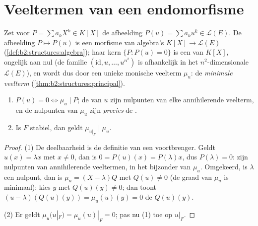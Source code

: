 \section{Veeltermen van een endomorfisme}

\begin{definition}\label{def:b2:reduction:polyu}
Zet voor $P = \sum a_k X^k \in K[X]$ de afbeelding $P(u) = \sum a_k
u^k \in \mathcal{L}(E)$. De afbeelding $P \mapsto P(u)$ is een
morfisme van algebra's $K[X] \to \mathcal{L}(E)$
(\cref{def:b2:structures:algebra}); haar kern $\{P : P(u) = 0\}$ is
een  van $K[X]$, ongelijk aan nul (de familie
$(\mathrm{id}, u, \dots, u^{n^2})$ is afhankelijk in het
$n^2$-dimensionale $\mathcal{L}(E)$), en wordt dus 
door een unieke monische veelterm $\mu_u$: de \emph{minimale
veelterm}
(\cref{thm:b2:structures:principal}).
\end{definition}

\begin{proposition}\label{prop:b2:reduction:minpoly}
\begin{enumerate}
  \item $P(u) = 0 \iff \mu_u \mid P$; de  van $u$ zijn
        nulpunten van elke annihilerende veelterm, en de nulpunten
        van $\mu_u$ zijn \emph{precies} de .
  \item Is $F$ stabiel, dan geldt $\mu_{u|_F} \mid \mu_u$.
\end{enumerate}
\end{proposition}

\begin{proof}
(1) De deelbaarheid is de definitie van een voortbrenger. Geldt
$u(x) = \lambda x$ met $x \neq 0$, dan is $0 = P(u)(x) =
P(\lambda)x$, dus $P(\lambda) = 0$:  zijn nulpunten van
annihilerende veeltermen, in het bijzonder van $\mu_u$. Omgekeerd,
is $\lambda$ een nulpunt, dan is $\mu_u = (X - \lambda)Q$ met
$Q(u) \neq 0$ (de graad van $\mu_u$ is minimaal): kies $y$ met
$Q(u)(y) \neq 0$; dan toont $(u - \lambda)(Q(u)(y)) = \mu_u(u)(y) =
0$ de  $Q(u)(y)$.

(2) Er geldt $\mu_u(u|_F) = \mu_u(u)|_F = 0$; pas nu (1) toe op
$u|_F$.
\end{proof}

